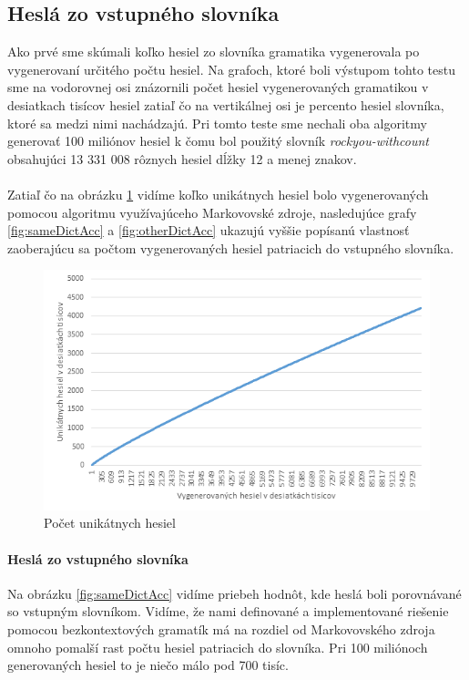 \subsection{Heslá zo vstupného slovníka}
Ako prvé sme skúmali koľko hesiel zo slovníka gramatika vygenerovala po vygenerovaní určitého počtu hesiel. Na grafoch, ktoré boli výstupom tohto testu sme na vodorovnej osi znázornili počet hesiel vygenerovaných gramatikou v desiatkach tisícov hesiel zatiaľ čo na vertikálnej osi je percento hesiel slovníka, ktoré sa medzi nimi nachádzajú. Pri tomto teste sme nechali oba algoritmy generovať 100 miliónov hesiel k čomu bol použitý slovník \emph{rockyou-withcount} obsahujúci 13 331 008 rôznych hesiel dĺžky 12 a menej znakov.

\paragraph{}
Zatiaľ čo na obrázku \ref{fig:uniqMarkov} vidíme koľko unikátnych hesiel bolo vygenerovaných pomocou algoritmu využívajúceho Markovovské zdroje, nasledujúce grafy \ref{fig:sameDictAcc} a \ref{fig:otherDictAcc} ukazujú vyššie popísanú vlastnosť zaoberajúcu sa počtom vygenerovaných hesiel patriacich do vstupného slovníka.

\begin{figure}[ht]
    \centering
    \includegraphics[width=1\textwidth]{uniqMarkov}
    \caption{Počet unikátnych hesiel}
    \label{fig:uniqMarkov}
\end{figure}
\paragraph{Heslá zo vstupného slovníka}
Na obrázku \ref{fig:sameDictAcc} vidíme priebeh hodnôt, kde heslá boli porovnávané so vstupným slovníkom. Vidíme, že nami definované a implementované riešenie pomocou bezkontextových gramatík má na rozdiel od Markovovského zdroja omnoho pomalší rast počtu hesiel patriacich do slovníka. Pri 100 miliónoch generovaných hesiel to je niečo málo pod 700 tisíc.

